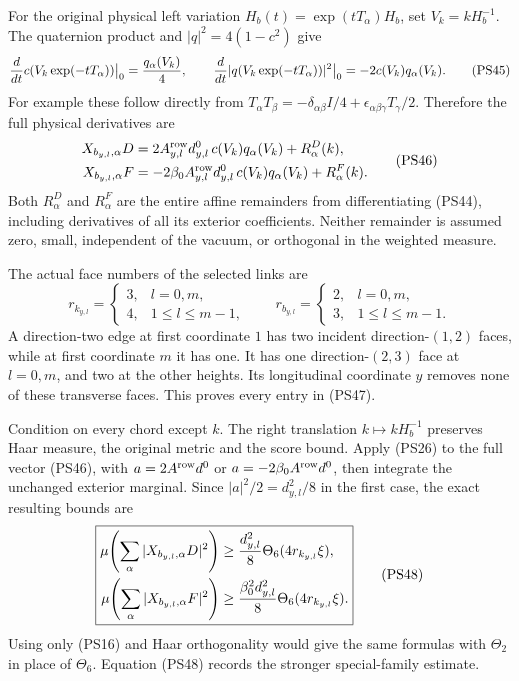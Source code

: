 \documentclass[11pt]{article}
\begin{document}
For the original physical left variation
\(H_b(t)=\exp(tT_\alpha)H_b\), set \(V_k=kH_b^{-1}\). The
quaternion product and \(|q|^2=4(1-c^2)\) give
\[
 {d\over dt}c(V_k\exp(-tT_\alpha))\big|_0={q_\alpha(V_k)\over4},
 \qquad
 {d\over dt}|q(V_k\exp(-tT_\alpha))|^2\big|_0
       =-2c(V_k)q_\alpha(V_k).
 \tag{PS45}
\]
For example these follow directly from
\(T_\alpha T_\beta=-\delta_{\alpha\beta}I/4+
\epsilon_{\alpha\beta\gamma}T_\gamma/2\). Therefore the full
physical derivatives are
\[
 \begin{aligned}
 X_{b_{y,l},\alpha}D
   &=2A^{\rm row}_{y,l}d^0_{y,l}\,c(V_k)q_\alpha(V_k)
                                       +R^D_\alpha(k),\\
 X_{b_{y,l},\alpha}F
   &=-2\beta_0A^{\rm row}_{y,l}d^0_{y,l}\,
                       c(V_k)q_\alpha(V_k)+R^F_\alpha(k).
 \end{aligned}
 \tag{PS46}
\]
Both \(R^D_\alpha\) and \(R^F_\alpha\) are the entire affine
remainders from differentiating (PS44), including derivatives of
all its exterior coefficients. Neither remainder is assumed zero,
small, independent of the vacuum, or orthogonal in the weighted
measure.

The actual face numbers of the selected links are
\[
 r_{k_{y,l}}=
 \begin{cases}3,&l=0,m,\\4,&1\le l\le m-1,\end{cases}
 \qquad
 r_{b_{y,l}}=
 \begin{cases}2,&l=0,m,\\3,&1\le l\le m-1.\end{cases}
 \tag{PS47}
\]
A direction-two edge at first coordinate \(1\) has two incident
direction-\((1,2)\) faces, while at first coordinate \(m\) it has
one. It has one direction-\((2,3)\) face at \(l=0,m\), and two
at the other heights. Its longitudinal coordinate \(y\) removes
none of these transverse faces. This proves every entry in (PS47).

Condition on every chord except \(k\). The right translation
\(k\mapsto kH_b^{-1}\) preserves Haar measure, the original metric
and the score bound. Apply (PS26) to the full vector (PS46),
with \(a=2A^{\rm row}d^0\) or
\(a=-2\beta_0A^{\rm row}d^0\), then integrate the unchanged
exterior marginal. Since \(|a|^2/2=d_{y,l}^2/8\) in the first
case, the exact resulting bounds are
\[
 \boxed{\begin{aligned}
 \mu\!\left(\sum_\alpha|X_{b_{y,l},\alpha}D|^2\right)
       &\ge{d_{y,l}^2\over8}\Theta_6(4r_{k_{y,l}}\xi),\\
 \mu\!\left(\sum_\alpha|X_{b_{y,l},\alpha}F|^2\right)
       &\ge{\beta_0^2d_{y,l}^2\over8}
                                      \Theta_6(4r_{k_{y,l}}\xi).
 \end{aligned}}
 \tag{PS48}
\]
Using only (PS16) and Haar orthogonality would give the same
formulas with \(\Theta_2\) in place of \(\Theta_6\).
Equation (PS48) records the stronger special-family estimate.
\end{document}
